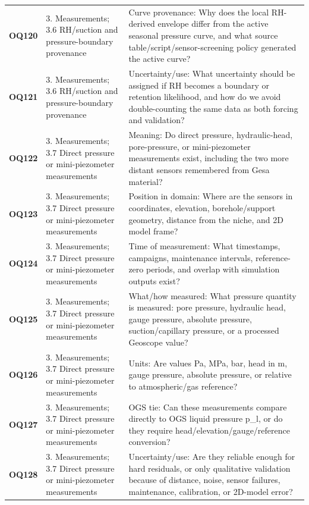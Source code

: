 \begin{longtable}{@{}L{0.10\textwidth} L{0.23\textwidth} L{0.59\textwidth}@{}}
\addlinespace[0.16em]
\textbf{OQ120} & 3. Measurements; 3.6 RH/suction and pressure-boundary provenance & Curve provenance: Why does the local RH-derived envelope differ from the active seasonal pressure curve, and what source table/script/sensor-screening policy generated the active curve?\\
\addlinespace[0.16em]
\textbf{OQ121} & 3. Measurements; 3.6 RH/suction and pressure-boundary provenance & Uncertainty/use: What uncertainty should be assigned if RH becomes a boundary or retention likelihood, and how do we avoid double-counting the same data as both forcing and validation?\\
\addlinespace[0.16em]
\textbf{OQ122} & 3. Measurements; 3.7 Direct pressure or mini-piezometer measurements & Meaning: Do direct pressure, hydraulic-head, pore-pressure, or mini-piezometer measurements exist, including the two more distant sensors remembered from Gesa material?\\
\addlinespace[0.16em]
\textbf{OQ123} & 3. Measurements; 3.7 Direct pressure or mini-piezometer measurements & Position in domain: Where are the sensors in coordinates, elevation, borehole/support geometry, distance from the niche, and 2D model frame?\\
\addlinespace[0.16em]
\textbf{OQ124} & 3. Measurements; 3.7 Direct pressure or mini-piezometer measurements & Time of measurement: What timestamps, campaigns, maintenance intervals, reference-zero periods, and overlap with simulation outputs exist?\\
\addlinespace[0.16em]
\textbf{OQ125} & 3. Measurements; 3.7 Direct pressure or mini-piezometer measurements & What/how measured: What pressure quantity is measured: pore pressure, hydraulic head, gauge pressure, absolute pressure, suction/capillary pressure, or a processed Geoscope value?\\
\addlinespace[0.16em]
\textbf{OQ126} & 3. Measurements; 3.7 Direct pressure or mini-piezometer measurements & Units: Are values Pa, MPa, bar, head in m, gauge pressure, absolute pressure, or relative to atmospheric/gas reference?\\
\addlinespace[0.16em]
\textbf{OQ127} & 3. Measurements; 3.7 Direct pressure or mini-piezometer measurements & OGS tie: Can these measurements compare directly to OGS liquid pressure p\_l, or do they require head/elevation/gauge/reference conversion?\\
\addlinespace[0.16em]
\textbf{OQ128} & 3. Measurements; 3.7 Direct pressure or mini-piezometer measurements & Uncertainty/use: Are they reliable enough for hard residuals, or only qualitative validation because of distance, noise, sensor failures, maintenance, calibration, or 2D-model error?\\

\end{longtable}
